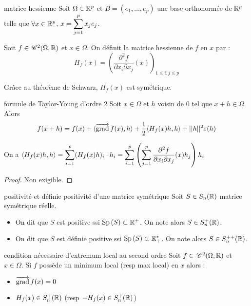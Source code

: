 \begin{definition}{matrice hessienne}{}
    Soit $\Omega \in \mathbb{R}^p$ et $B = (e_1, \ldots, e_p)$ une base orthonormée de $\mathbb{R}^p$
    telle que $\forall x \in \mathbb{R}^p$, $x = \displaystyle \sum_{j = 1}^{p } x_j e_j$.

    Soit $f \in \,\mathscr C^{2}(\Omega, \mathbb{R})$ et $x \in \Omega$. On définit la matrice hessienne
    de $f$ en $x$ par : 
    $$H_f(x) = \left( \frac{\partial^2 f}{\partial x_i \partial x_j} (x) \right)_{1 \leqslant i, j \leqslant p}$$

    Grâce au théorème de Schwarz, $H_f(x)$ est symétrique.
\end{definition}

\begin{proposition}{formule de Taylor-Young d'ordre 2}{}
    Soit $x \in \Omega$ et $h$ voisin de $0$ tel que $x + h \in \Omega$. Alors 
    $$f(x + h) = f(x) + \langle \overrightarrow{\operatorname{grad}} \, f(x), h \rangle + \frac 1 2 \langle H_f(x) h, h \rangle + ||h||^2 \varepsilon(h) $$
\end{proposition}

\begin{remarque}
    On a $\langle H_f(x) h, h \rangle = \displaystyle \sum_{i = 1 }^{p } (H_f(x) h)_i \cdot h_i = \sum_{i = 1}^{p } \left( \sum_{j = 1}^{p } \frac{\partial^2 f}{\partial x_i \partial x_j} (x) h_j \right) h_i$
\end{remarque}

\begin{proof}
    Non exigible. 
\end{proof}

\begin{definition}{positivité et définie positivité d'une matrice symétrique}{}
    Soit $S \in S_n(\mathbb{R})$ matrice symétrique réelle. 
    \begin{itemize}
        \item On dit que $S$ est positive ssi $\operatorname{Sp} \, (S) \subset \mathbb{R}^+$. On note alors $S \in S_n^+(\mathbb{R})$. 
        \item On dit que $S$ est définie positive ssi $\operatorname{Sp} \,(S) \subset \mathbb{R}_+^*$. On note alors $S \in S_n^{++}(\mathbb{R})$.
    \end{itemize}
\end{definition}

\begin{theoreme}{condition nécessaire d'extremum local au second ordre}{}
    Soit $f \in \,\mathscr C^{2} (\Omega, \mathbb{R})$ et $x \in \Omega$. Si $f$ possède un minimum local
    (resp max local) en $x$ alors : 
    \begin{itemize}
        \item $\overrightarrow{\operatorname{grad}} \, f (x) = 0$
        \item $H_f(x) \in S_n^+(\mathbb{R})$ (resp $-H_f(x) \in S_n^+(\mathbb{R})$) 
    \end{itemize}
\end{theoreme}

